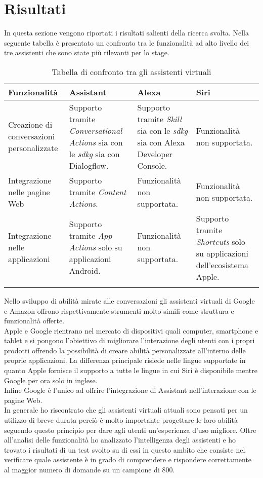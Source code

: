 \section{Risultati}
In questa sezione vengono riportati i risultati salienti della ricerca svolta. Nella seguente tabella è presentato un confronto tra le funzionalità ad alto livello dei tre assistenti che sono state più rilevanti per lo stage.
	\begin{longtable}{|p{2.5cm}|p{3cm}|p{3cm}|p{3cm}|}
		\hline
		\textbf{Funzionalità} & \textbf{Assistant} & \textbf{Alexa} & \textbf{Siri} \\\hline
		
		Creazione di conversazioni personalizzate & Supporto tramite \emph{Conversational Actions} sia con le \emph{\gls{sdkg}} sia con Dialogflow.  & Supporto tramite \emph{Skill} sia con le \emph{\gls{sdkg}} sia con Alexa Developer Console. & Funzionalità non supportata. \\
		\hline
		Integrazione nelle pagine Web & Supporto tramite \emph{Content Actions}. & Funzionalità non supportata. & Funzionalità non supportata. \\
		\hline
		Integrazione nelle applicazioni & Supporto tramite \emph{App Actions} solo su applicazioni Android. & Funzionalità non supportata. & Supporto tramite \emph{Shortcuts} solo su applicazioni dell'ecosistema Apple. \\
		\hline
		\caption{Tabella di confronto tra gli assistenti virtuali}
	\end{longtable}
Nello sviluppo di abilità mirate alle conversazioni gli assistenti virtuali di Google e Amazon offrono rispettivamente strumenti molto simili come struttura e funzionalità offerte. \\
Apple e Google rientrano nel mercato di dispositivi quali computer, smartphone e tablet e si pongono l'obiettivo di migliorare l’interazione degli utenti con i propri prodotti offrendo la possibilità di creare abilità personalizzate all'interno delle proprie applicazioni. La differenza principale risiede nelle lingue supportate in quanto Apple fornisce il supporto a tutte le lingue in cui Siri è disponibile mentre Google per ora solo in inglese. \\
Infine Google è l'unico ad offrire l'integrazione di Assistant nell'interazione con le pagine Web. \\
In generale ho riscontrato che gli assistenti virtuali attuali sono pensati per un utilizzo di breve durata perciò è molto importante progettare le loro abilità seguendo questo principio per dare agli utenti un'esperienza d'uso migliore.
Oltre all'analisi delle funzionalità ho analizzato l'intelligenza degli assistenti e ho trovato i risultati di un test svolto su di essi in questo ambito che consiste nel verificare quale assistente è in grado di comprendere e rispondere correttamente al maggior numero di domande su un campione di 800.

